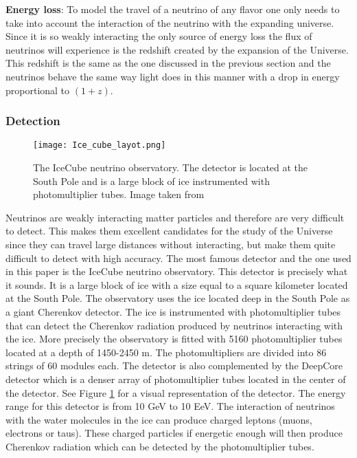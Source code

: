 \textbf{Energy loss}:
To model the travel of a neutrino of any flavor one only needs to take into account the interaction of the neutrino with the expanding universe. Since it is so weakly interacting the only 
source of energy loss the flux of neutrinos will experience is the redshift created by the expansion of the Universe. This redshift is the same as the one discussed in the previous section and the neutrinos 
behave the same way light does in this manner with a drop in energy proportional to $(1+z)$.



 

\subsubsection{Detection}
\begin{figure}
    \centering
    \texttt{[image: Ice\_cube\_layot.png]}
    \caption{The IceCube neutrino observatory. The detector is located at the South Pole and is a large block of ice instrumented with photomultiplier tubes. Image taken from \cite{Andeen_2019}}
    \label{fig:Ice_cube}
\end{figure}

Neutrinos are weakly interacting matter particles and therefore are very difficult to detect. This makes them excellent candidates for the study of the Universe since they can travel large distances without interacting, but make them 
quite difficult to detect with high accuracy. The most famous detector and the one used in this paper is the IceCube neutrino observatory. This detector is precisely what it sounds. It is a large block of ice with a size equal to a square kilometer located at the South Pole.
The observatory uses the ice located deep in the South Pole as a giant Cherenkov detector. The ice is instrumented with photomultiplier tubes that can detect the Cherenkov radiation produced by neutrinos interacting with the ice. 
More precisely the observatory is fitted with 5160 photomultiplier tubes located at a depth of 1450-2450 m. The photomultipliers are divided into 86 strings of 60 modules each. The detector is also complemented by the DeepCore detector which is a denser array of photomultiplier tubes located in the center of the detector. See Figure \ref{fig:Ice_cube} for a visual representation of the detector.
The energy range for this detector is from 10 GeV to 10 EeV. The interaction of neutrinos with the water molecules in the ice can produce charged leptons (muons, electrons or taus). These charged particles if energetic enough will then produce Cherenkov radiation which can be detected by the photomultiplier tubes.


